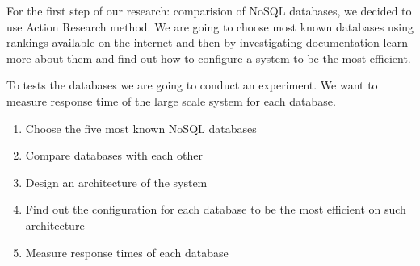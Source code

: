 \documentclass[times, 10pt,twocolumn]{article}
\begin{document}

For the first step of our research: comparision of NoSQL databases, we decided to use Action Research method.
We are going to choose most known databases using rankings available on the internet and then by investigating
documentation learn more about them and find out how to configure a system to be the most efficient.

To tests the databases we are going to conduct an experiment. We want to measure response time of the large scale
system for each database.


\begin{enumerate}
  \item Choose the five most known NoSQL databases
  \item Compare databases with each other
  \item Design an architecture of the system
  \item Find out the configuration for each database to be the most efficient on such architecture
  \item Measure response times of each database
\end{enumerate}
\end{document}
